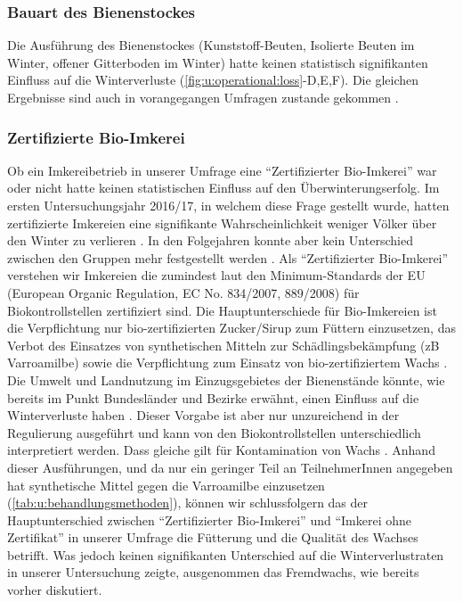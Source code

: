 \subsubsection{Bauart des Bienenstockes}

Die Ausführung des Bienenstockes (Kunststoff-Beuten, Isolierte Beuten im Winter, offener Gitterboden im Winter) hatte keinen statistisch signifikanten Einfluss auf die Winterverluste (\cref{fig:u:operational:loss}-D,E,F). Die gleichen Ergebnisse sind auch in vorangegangen Umfragen zustande gekommen \citep{crailsheim2018, oberreiter2020}.

\subsubsection{Zertifizierte Bio-Imkerei}

Ob ein Imkereibetrieb in unserer Umfrage eine \enquote{Zertifizierter Bio-Imkerei} war oder nicht hatte keinen statistischen Einfluss auf den Überwinterungserfolg. Im ersten Untersuchungsjahr 2016/17, in welchem diese Frage gestellt wurde, hatten zertifizierte Imkereien eine signifikante Wahrscheinlichkeit weniger Völker über den Winter zu verlieren \citep{crailsheim2018}. In den Folgejahren konnte aber kein Unterschied zwischen den Gruppen mehr festgestellt werden \citep{brodschneider2018a, oberreiter2020}.
\newline
Als \enquote{Zertifizierter Bio-Imkerei} verstehen wir Imkereien die zumindest laut den Minimum-Standards der EU (European Organic Regulation, EC No. 834/2007, 889/2008) für Biokontrollstellen zertifiziert sind. Die Hauptunterschiede für Bio-Imkereien ist die Verpflichtung nur bio-zertifizierten Zucker/Sirup zum Füttern einzusetzen, das Verbot des Einsatzes von synthetischen Mitteln zur Schädlingsbekämpfung (zB Varroamilbe) sowie die Verpflichtung zum Einsatz von bio-zertifiziertem Wachs \citep{thrasyvoulou2015}. Die Umwelt und Landnutzung im Einzugsgebietes der Bienenstände könnte, wie bereits im Punkt Bundesländer und Bezirke erwähnt, einen Einfluss auf die Winterverluste haben \citep{kuchling2018}. Dieser Vorgabe ist aber nur unzureichend in der Regulierung ausgeführt und kann von den Biokontrollstellen unterschiedlich interpretiert werden. Dass gleiche gilt für Kontamination von Wachs \citep{thrasyvoulou2015}.
\newline
Anhand dieser Ausführungen, und da nur ein geringer Teil an TeilnehmerInnen angegeben hat synthetische Mittel gegen die Varroamilbe einzusetzen (\cref{tab:u:behandlungsmethoden}), können wir schlussfolgern das der Hauptunterschied zwischen \enquote{Zertifizierter Bio-Imkerei} und \enquote{Imkerei ohne Zertifikat} in unserer Umfrage die Fütterung und die Qualität des Wachses betrifft. Was jedoch keinen signifikanten Unterschied auf die Winterverlustraten in unserer Untersuchung zeigte, ausgenommen das Fremdwachs, wie bereits vorher diskutiert.

